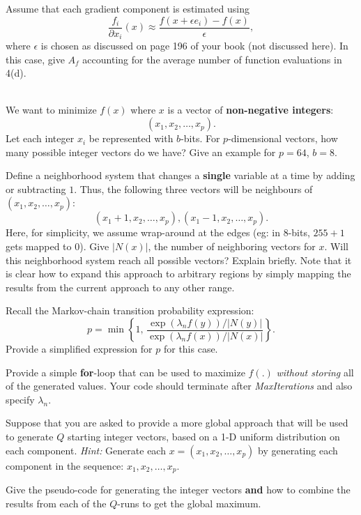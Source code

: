 \documentclass[12pt,legalpaper]{article}
\begin{document}
 Assume that each gradient component is estimated
using
 $$\frac{f_i}{\partial x_i}(x) \approx \frac{f(x+\epsilon e_i)-f(x)}{\epsilon},$$
where $\epsilon$ is chosen as discussed on page 196 of your book (not discussed here). In this case, give $A_f$ accounting for the average number of function
evaluations in 4(d).

\newpage
{}\\
 We want to minimize $f(x)$
  where $x$ is a vector of {\bf non-negative integers}:
      $$(x_1, x_2, \dots, x_p).$$
  Let each integer $x_i$ be represented with $b$-bits.
  For $p$-dimensional vectors, how many possible integer vectors do we
  have? Give an example for $p=64$, $b=8$.\\
  \vspace{3.0 true in}


      
 Define a neighborhood system that changes
  a {\bf single} variable at a time by adding or subtracting $1$. Thus, 
  the following three vectors will be neighbours of $(x_1, x_2, \dots, x_p)$:
      $$(x_1+1, x_2, \dots, x_p), (x_1-1, x_2, \dots, x_p).$$
  Here, for simplicity, we assume wrap-around at the edges (eg: in $8$-bits, $255+1$ gets mapped to $0$). Give $|N(x)|$, the number of neighboring
  vectors for $x$. Will this neighborhood system reach all possible vectors?
  Explain briefly. Note that it is clear how to expand this approach to arbitrary regions by simply mapping the results from the current approach to any other range.\\
  \vspace{4.0 true in}
  \newpage
  
%  
 Recall the Markov-chain transition probability expression: 
  \begin{equation*}
      p = \min \left\{1, \,
                 \frac{\exp{(\lambda_n f(y))}/|N(y)|}{
                          \exp{(\lambda_n f(x))}/|N(x)|}
              \right\}.
  \end{equation*}
Provide a simplified expression for $p$ for this case.\\
\vspace{3.0 true in}

 Provide a simple {\bf for}-loop
that can be used to maximize $f(.)$ {\it without storing} all
of the generated values. Your code should terminate after 
{\it MaxIterations} and also specify $\lambda_n$.
\vspace{3.0 true in}   
\newpage

 Suppose that you are asked to provide a more
 global approach that will be used to generate $Q$ starting integer vectors,
 based on a 1-D uniform distribution on each component. {\it Hint:} Generate
 each $x=(x_1, x_2, \dots, x_p)$ by generating each component in the sequence: $x_1, x_2, \dots, x_p$.
 
 Give the pseudo-code for generating the integer vectors {\bf and} how to
 combine the results from each of the $Q$-runs to get the global maximum.
\end{document}
